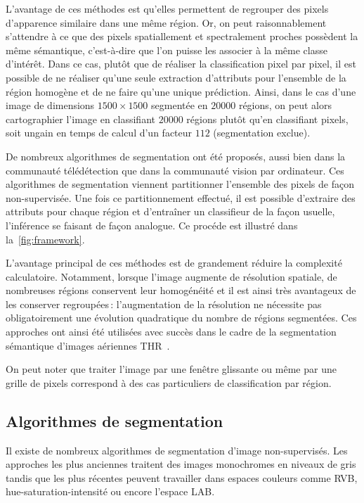 L'avantage de ces méthodes est qu'elles permettent de regrouper des pixels d'apparence similaire dans une même région. Or, on peut raisonnablement s'attendre à ce que des pixels spatiallement et spectralement proches possèdent la même sémantique, c'est-à-dire que l'on puisse les associer à la même classe d'intérêt. Dans ce cas, plutôt que de réaliser la classification pixel par pixel, il est possible de ne réaliser qu'une seule extraction d'attributs pour l'ensemble de la région homogène et de ne faire qu'une unique prédiction. Ainsi, dans le cas d'une image de dimensions $1500\times1500$ segmentée en $20 000$ régions, on peut alors cartographier l'image en classifiant $20 000$ régions plutôt qu'en classifiant  pixels, soit ungain en temps de calcul d'un facteur $112$ (segmentation exclue).

De nombreux algorithmes de segmentation ont été proposés, aussi bien dans la communauté télédétection que dans la communauté vision par ordinateur. Ces algorithmes de segmentation viennent partitionner l'ensemble des pixels de façon non-supervisée. Une fois ce partitionnement effectué, il est possible d'extraire des attributs pour chaque région et d'entraîner un classifieur de la façon usuelle, l'inférence se faisant de façon analogue. Ce procéde est illustré dans la~\cref{fig:framework}.

L'avantage principal de ces méthodes est de grandement réduire la complexité calculatoire. Notamment, lorsque l'image augmente de résolution spatiale, de nombreuses régions conservent leur homogénéité et il est ainsi très avantageux de les conserver regroupées\,: l'augmentation de la résolution ne nécessite pas obligatoirement une évolution quadratique du nombre de régions segmentées. Ces approches ont ainsi été utilisées avec succès dans le cadre de la segmentation sémantique d'images aériennes \gls{THR}~\cite{lagrange_benchmarking_2015,vargas_superpixel-based_2014}.

On peut noter que traiter l'image par une fenêtre glissante ou même par une grille de pixels correspond à des cas particuliers de classification par région.

\subsection{Algorithmes de segmentation}

Il existe de nombreux algorithmes de segmentation d'image non-supervisés. Les approches les plus anciennes traitent des images monochromes en niveaux de gris tandis que les plus récentes peuvent travailler dans espaces couleurs comme \gls{RVB}, hue-saturation-intensité ou encore l'espace \gls{LAB}.

